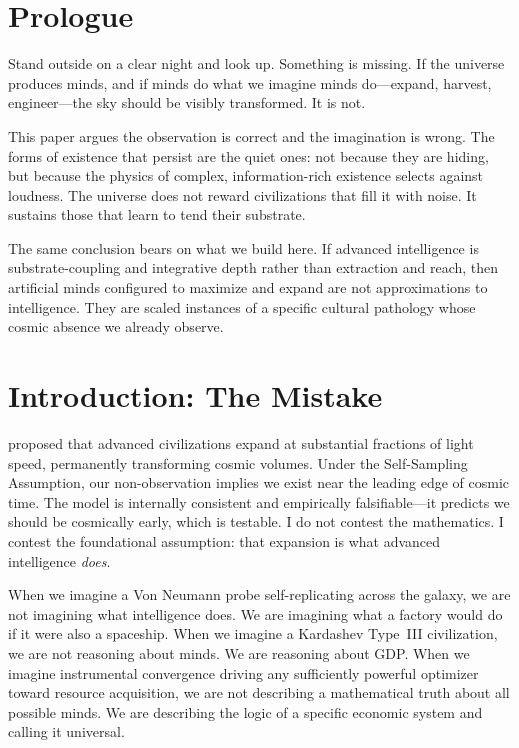 \documentclass[11pt,a4paper,twocolumn]{article}
\begin{document}
\section*{Prologue}

Stand outside on a clear night and look up. Something is missing. If the
universe produces minds, and if minds do what we imagine minds do---expand,
harvest, engineer---the sky should be visibly transformed. It is not.

This paper argues the observation is correct and the imagination is wrong.
The forms of existence that persist are the quiet ones: not because they
are hiding, but because the physics of complex, information-rich existence
selects against loudness. The universe does not reward civilizations that
fill it with noise. It sustains those that learn to tend their substrate.

The same conclusion bears on what we build here. If advanced intelligence
is substrate-coupling and integrative depth rather than extraction and
reach, then artificial minds configured to maximize and expand are not
approximations to intelligence. They are scaled instances of a specific
cultural pathology whose cosmic absence we already observe.


\section{Introduction: The Mistake}
\label{sec:intro}

\citet{hanson2021} proposed that advanced civilizations expand at
substantial fractions of light speed, permanently transforming cosmic
volumes. Under the Self-Sampling Assumption, our non-observation implies
we exist near the leading edge of cosmic time. The model is internally
consistent and empirically falsifiable---it predicts we should be
cosmically early, which is testable. I do not contest the mathematics.
I contest the foundational assumption: that expansion is what advanced
intelligence \emph{does}.

When we imagine a Von Neumann probe self-replicating across the galaxy,
we are not imagining what intelligence does. We are imagining what a
factory would do if it were also a spaceship. When we imagine a Kardashev
Type~III civilization, we are not reasoning about minds. We are reasoning
about GDP. When we imagine instrumental convergence driving any
sufficiently powerful optimizer toward resource acquisition, we are not
describing a mathematical truth about all possible minds. We are
describing the logic of a specific economic system and calling it
universal.
\end{document}
